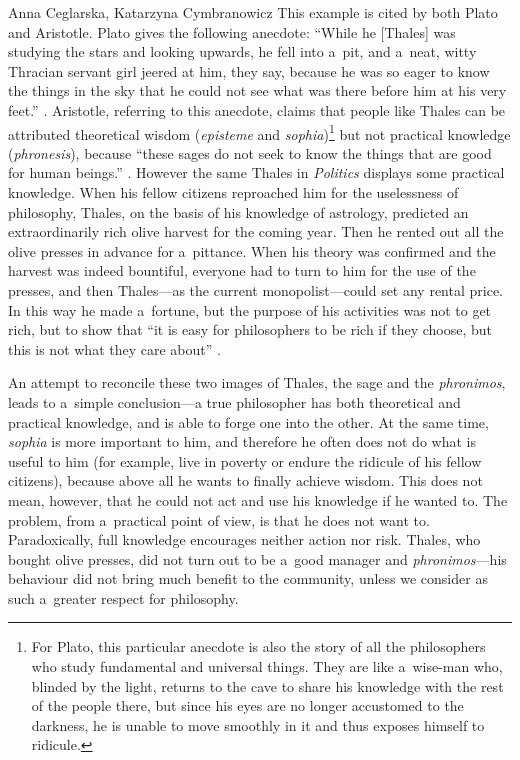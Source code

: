 \begin{artengenv2auth}{Anna Ceglarska, Katarzyna Cymbranowicz}
This example is cited by both Plato and Aristotle. Plato gives the following anecdote: ``While he [Thales] was studying the stars and looking upwards, he fell into a~pit, and a~neat, witty Thracian servant girl jeered at him, they say, because he was so eager to know the things in the sky that he could not see what was there before him at his very feet.'' 
\parencite[][ {174a}]{plato_plato_1921}. %
 Aristotle, referring to this anecdote, claims that people like Thales can be attributed theoretical wisdom (\textit{episteme} and \textit{sophia})\footnote{For Plato, this particular anecdote is also the story of all the philosophers who study fundamental and universal things. They are like a~wise-man who, blinded by the light, returns to the cave to share his knowledge with the rest of the people there, but since his eyes are no longer accustomed to the darkness, he is unable to move smoothly in it and thus exposes himself to ridicule.} but not practical knowledge (\textit{phronesis}), because ``these sages do not seek to know the things that are good for human beings.'' 
\parencite[][]{rackham_nicomachean_1934}. %
 However the same Thales in \textit{Politics} displays some practical knowledge. When his fellow citizens reproached him for the uselessness of philosophy, Thales, on the basis of his knowledge of astrology, predicted an extraordinarily rich olive harvest for the coming year. Then he rented out all the olive presses in advance for a~pittance. When his theory was confirmed and the harvest was indeed bountiful, everyone had to turn to him for the use of the presses, and then Thales---as the current monopolist---could set any rental price. In this way he made a~fortune, but the purpose of his activities was not to get rich, but to show that ``it is easy for philosophers to be rich if they choose, but this is not what they care about'' 
\parencite[][1.1259a]{aristotle_politics_1944}.%




An attempt to reconcile these two images of Thales, the sage and the \textit{phronimos}, leads to a~simple conclusion---a true philosopher has both theoretical and practical knowledge, and is able to forge one into the other. At the same time, \textit{sophia} is more important to him, and therefore he often does not do what is useful to him (for example, live in poverty or endure the ridicule of his fellow citizens), because above all he wants to finally achieve wisdom. This does not mean, however, that he could not act and use his knowledge if he wanted to. The problem, from a~practical point of view, is that he does not want to. Paradoxically, full knowledge encourages neither action nor risk. Thales, who bought olive presses, did not turn out to be a~good manager and \textit{phronimos}---his behaviour did not bring much benefit to the community, unless we consider as such a~greater respect for philosophy.




\end{artengenv2auth}
